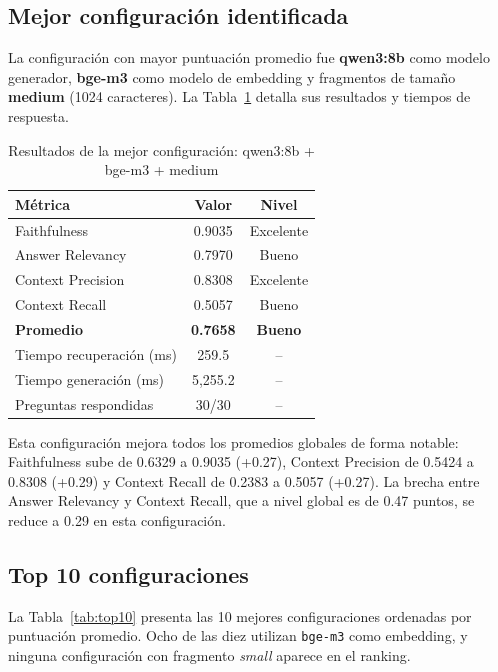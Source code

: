 \documentclass{article}
\begin{document}
\subsection{Mejor configuración identificada}

La configuración con mayor puntuación promedio fue \textbf{qwen3:8b} como
modelo generador, \textbf{bge-m3} como modelo de embedding y fragmentos de
tamaño \textbf{medium} (1024 caracteres). La Tabla~\ref{tab:mejor} detalla sus
resultados y tiempos de respuesta.

\begin{table}[H]
\centering
\begin{tabular}{|l|c|c|}
\hline
\textbf{Métrica} & \textbf{Valor} & \textbf{Nivel} \\
\hline
Faithfulness      & 0.9035 & Excelente \\
Answer Relevancy  & 0.7970 & Bueno \\
Context Precision & 0.8308 & Excelente \\
Context Recall    & 0.5057 & Bueno \\
\textbf{Promedio} & \textbf{0.7658} & \textbf{Bueno} \\
\hline
Tiempo recuperación (ms) & 259.5 & -- \\
Tiempo generación (ms)   & 5{,}255.2 & -- \\
Preguntas respondidas    & 30/30 & -- \\
\hline
\end{tabular}
\caption{Resultados de la mejor configuración: qwen3:8b + bge-m3 + medium}
\label{tab:mejor}
\end{table}

Esta configuración mejora todos los promedios globales de forma notable:
Faithfulness sube de 0.6329 a 0.9035 (+0.27), Context Precision de 0.5424 a
0.8308 (+0.29) y Context Recall de 0.2383 a 0.5057 (+0.27). La brecha entre
Answer Relevancy y Context Recall, que a nivel global es de 0.47 puntos, se
reduce a 0.29 en esta configuración.

\subsection{Top 10 configuraciones}

La Tabla~\ref{tab:top10} presenta las 10 mejores configuraciones ordenadas por
puntuación promedio. Ocho de las diez utilizan \texttt{bge-m3} como embedding,
y ninguna configuración con fragmento \textit{small} aparece en el ranking.
\end{document}
